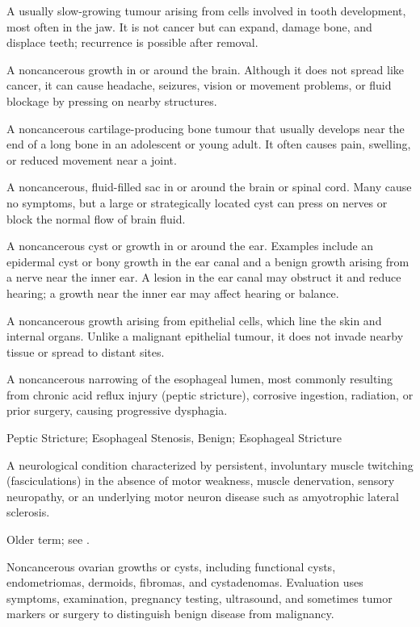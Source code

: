  A usually slow-growing tumour arising from cells involved in tooth development, most often in the jaw. It is not cancer but can expand, damage bone, and displace teeth; recurrence is possible after removal.

 A noncancerous growth in or around the brain. Although it does not spread like cancer, it can cause headache, seizures, vision or movement problems, or fluid blockage by pressing on nearby structures.

 A noncancerous cartilage-producing bone tumour that usually develops near the end of a long bone in an adolescent or young adult. It often causes pain, swelling, or reduced movement near a joint.

 A noncancerous, fluid-filled sac in or around the brain or spinal cord. Many cause no symptoms, but a large or strategically located cyst can press on nerves or block the normal flow of brain fluid.

 A noncancerous cyst or growth in or around the ear. Examples include an epidermal cyst or bony growth in the ear canal and a benign growth arising from a nerve near the inner ear. A lesion in the ear canal may obstruct it and reduce hearing; a growth near the inner ear may affect hearing or balance.

 A noncancerous growth arising from epithelial
cells, which line the skin and internal organs. Unlike a malignant epithelial
tumour, it does not invade nearby tissue or spread to distant sites.

 A noncancerous narrowing of the esophageal lumen, most commonly resulting from chronic acid reflux injury (peptic stricture), corrosive ingestion, radiation, or prior surgery, causing progressive dysphagia.

\synonyms
Peptic Stricture; Esophageal Stenosis, Benign; Esophageal Stricture

 A neurological condition characterized by persistent, involuntary muscle twitching (fasciculations) in the absence of motor weakness, muscle denervation, sensory neuropathy, or an underlying motor neuron disease such as amyotrophic lateral sclerosis.

 Older term; see .

 Noncancerous ovarian growths or cysts, including functional cysts, endometriomas, dermoids, fibromas, and cystadenomas. Evaluation uses symptoms, examination, pregnancy testing, ultrasound, and sometimes tumor markers or surgery to distinguish benign disease from malignancy.

